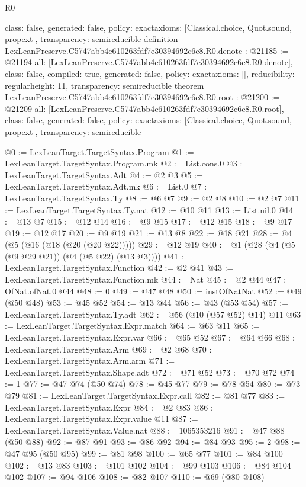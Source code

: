 \begin{lexlean}{R0}
\begin{coremodule}
{  class: false,
  generated: false,
  policy: exact{axioms: [Classical.choice, Quot.sound, propext]},
  transparency: semireducible
}
definition LexLeanPreserve.C5747abb4c610263fdf7e30394692c6c8.R0.denote : @21185 := @21194 {
  all: [LexLeanPreserve.C5747abb4c610263fdf7e30394692c6c8.R0.denote],
  class: false,
  compiled: true,
  generated: false,
  policy: exact{axioms: []},
  reducibility: regular{height: 11},
  transparency: semireducible
}
theorem LexLeanPreserve.C5747abb4c610263fdf7e30394692c6c8.R0.root : @21200 := @21209 {
  all: [LexLeanPreserve.C5747abb4c610263fdf7e30394692c6c8.R0.root],
  class: false,
  generated: false,
  policy: exact{axioms: [Classical.choice, Quot.sound, propext]},
  transparency: semireducible
}

@0 := LexLeanTarget.TargetSyntax.Program
@1 := LexLeanTarget.TargetSyntax.Program.mk
@2 := List.cons.{0}
@3 := LexLeanTarget.TargetSyntax.Adt
@4 := @2 @3
@5 := LexLeanTarget.TargetSyntax.Adt.mk
@6 := List.{0}
@7 := LexLeanTarget.TargetSyntax.Ty
@8 := @6 @7
@9 := @2 @8
@10 := @2 @7
@11 := LexLeanTarget.TargetSyntax.Ty.nat
@12 := @10 @11
@13 := List.nil.{0}
@14 := @13 @7
@15 := @12 @14
@16 := @9 @15
@17 := @12 @15
@18 := @9 @17
@19 := @12 @17
@20 := @9 @19
@21 := @13 @8
@22 := @18 @21
@28 := @4 (@5 (@16 (@18 (@20 (@20 @22)))))
@29 := @12 @19
@40 := @1 (@28 (@4 (@5 (@9 @29 @21)) (@4 (@5 @22) (@13 @3))))
@41 := LexLeanTarget.TargetSyntax.Function
@42 := @2 @41
@43 := LexLeanTarget.TargetSyntax.Function.mk
@44 := Nat
@45 := @2 @44
@47 := OfNat.ofNat.{0} @44
@48 := 0
@49 := @47 @48
@50 := instOfNatNat
@52 := @49 (@50 @48)
@53 := @45 @52
@54 := @13 @44
@56 := @43 (@53 @54)
@57 := LexLeanTarget.TargetSyntax.Ty.adt
@62 := @56 (@10 (@57 @52) @14) @11
@63 := LexLeanTarget.TargetSyntax.Expr.match
@64 := @63 @11
@65 := LexLeanTarget.TargetSyntax.Expr.var
@66 := @65 @52
@67 := @64 @66
@68 := LexLeanTarget.TargetSyntax.Arm
@69 := @2 @68
@70 := LexLeanTarget.TargetSyntax.Arm.arm
@71 := LexLeanTarget.TargetSyntax.Shape.adt
@72 := @71 @52
@73 := @70 @72
@74 := 1
@77 := @47 @74 (@50 @74)
@78 := @45 @77
@79 := @78 @54
@80 := @73 @79
@81 := LexLeanTarget.TargetSyntax.Expr.call
@82 := @81 @77
@83 := LexLeanTarget.TargetSyntax.Expr
@84 := @2 @83
@86 := LexLeanTarget.TargetSyntax.Expr.value @11
@87 := LexLeanTarget.TargetSyntax.Value.nat
@88 := 1065353216
@91 := @47 @88 (@50 @88)
@92 := @87 @91
@93 := @86 @92
@94 := @84 @93
@95 := 2
@98 := @47 @95 (@50 @95)
@99 := @81 @98
@100 := @65 @77
@101 := @84 @100
@102 := @13 @83
@103 := @101 @102
@104 := @99 @103
@106 := @84 @104 @102
@107 := @94 @106
@108 := @82 @107
@110 := @69 (@80 @108)

\end{coremodule}
\end{lexlean}
